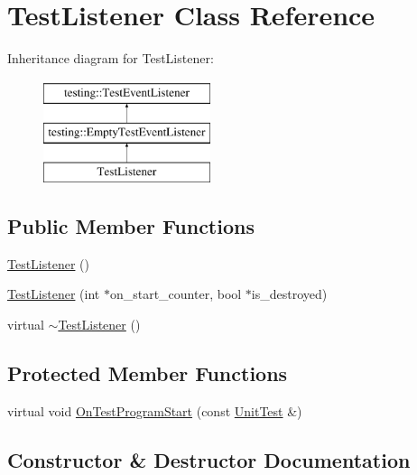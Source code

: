 \hypertarget{classTestListener}{}\section{Test\+Listener Class Reference}
\label{classTestListener}
Inheritance diagram for Test\+Listener\+:\begin{figure}[H]
\begin{center}
\leavevmode
\includegraphics[height=3.000000cm]{classTestListener}
\end{center}
\end{figure}
\subsection*{Public Member Functions}
\begin{DoxyCompactItemize}
\item 
\mbox{\hyperlink{classTestListener_ae20c874ce92777371de6d024df229e9f}{Test\+Listener}} ()
\item 
\mbox{\hyperlink{classTestListener_ab65604c6c3742c494e9378e770da5d42}{Test\+Listener}} (int $\ast$on\+\_\+start\+\_\+counter, bool $\ast$is\+\_\+destroyed)
\item 
virtual \mbox{\hyperlink{classTestListener_ae59dec3ae673618185eebf71881902e9}{$\sim$\+Test\+Listener}} ()
\end{DoxyCompactItemize}
\subsection*{Protected Member Functions}
\begin{DoxyCompactItemize}
\item 
virtual void \mbox{\hyperlink{classTestListener_a6218f522f5b6b37050ff0ea630ac5fd3}{On\+Test\+Program\+Start}} (const \mbox{\hyperlink{classtesting_1_1UnitTest}{Unit\+Test}} \&)
\end{DoxyCompactItemize}


\subsection{Constructor \& Destructor Documentation}
\mbox{\label{classTestListener_ae20c874ce92777371de6d024df229e9f}} 
